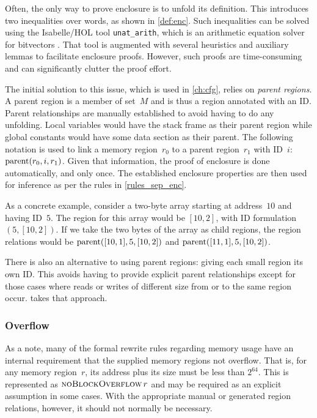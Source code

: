 Often, the only way to prove enclosure is to unfold its definition.
This introduces two inequalities over words, as shown in \cref{def:enc}.
Such inequalities can be solved using the Isabelle/HOL tool \lstinline{unat_arith}, which is an arithmetic equation solver for bitvectors \autocite{dawson2009isabelle,isabelle-word-session}.
That tool is augmented with several heuristics
and auxiliary lemmas to facilitate enclosure proofs.
However, such proofs are time-consuming
and can significantly clutter the proof effort.

The initial solution to this issue, which is used in \cref{ch:cfg},
relies on \emph{parent regions}.%
A parent region is a member of set~$M$ and is thus a region annotated with an ID.
Parent relationships are manually established to avoid having to do any unfolding.
Local variables would have the stack frame as their parent region
while global constants would have some data section as their parent.
The following notation is used to link a memory region~$r_0$
to a parent region~$r_1$ with ID~$i$: $\operatorname{parent}(r_0,i,r_1)$.
Given that information, the proof of enclosure is done automatically, and only once.
The established enclosure properties are then used for inference
as per the rules in \cref{rules_sep_enc}.

As a concrete example, consider a two-byte array starting at address~$10$
and having ID~$5$.
The region for this array would be $[10, 2]$, with ID formulation $(5, [10, 2])$.
If we take the two bytes of the array as child regions,
the region relations would be $\operatorname{parent}([10, 1],5,[10, 2])$
and $\operatorname{parent}([11, 1],5,[10, 2])$.

There is also an alternative to using parent regions:
giving each small region its own ID.
This avoids having to provide explicit parent relationships
except for those cases where reads or writes of different size
from or to the same region occur.  takes that approach.

\subsubsection{Overflow}
As a note, many of the formal rewrite rules regarding memory usage
have an internal requirement that the supplied memory regions not overflow.
That is, for any memory region~$r$,
its address plus its size must be less than $2^{64}$.
This is represented as $\operatorname{\textsc{noBlockOverflow}} r$ and may be required as an explicit assumption
in some cases. With the appropriate manual or generated region relations,
however, it should not normally be necessary.

